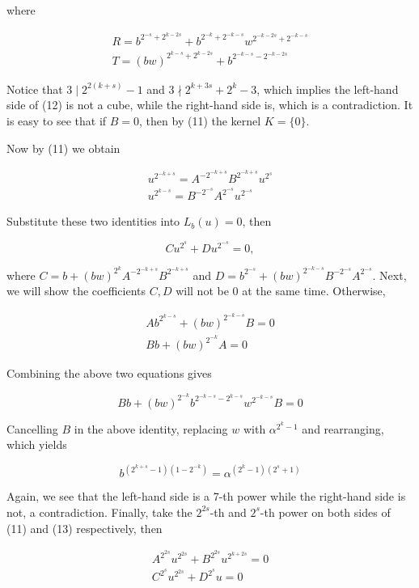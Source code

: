 \documentclass[10pt]{article}
\begin{document}
where

$$
\begin{gathered}
R=b^{2^{-s}+2^{k-2 s}}+b^{2^{-k}+2^{-k-s}} w^{2^{-k-2 s}+2^{-k-s}} \\
T=(b w)^{2^{k-s}+2^{k-2 s}}+b^{2^{-k-s}-2^{-k-2 s}}
\end{gathered}
$$

Notice that $3 \mid 2^{2(k+s)}-1$ and $3 \nmid 2^{k+3 s}+2^{k}-3$, which implies the left-hand side of (12) is not a cube, while the right-hand side is, which is a contradiction. It is easy to see that if $B=0$, then by (11) the kernel $K=\{0\}$.

Now by (11) we obtain

$$
\begin{gathered}
u^{2^{-k+s}}=A^{-2^{-k+s}} B^{2^{-k+s}} u^{2^{s}} \\
u^{2^{k-s}}=B^{-2^{-s}} A^{2^{-s}} u^{2^{-s}}
\end{gathered}
$$

Substitute these two identities into $L_{b}(u)=0$, then


\begin{equation*}
C u^{2^{s}}+D u^{2^{-s}}=0, \tag{13}
\end{equation*}


where $C=b+(b w)^{2^{k}} A^{-2^{-k+s}} B^{2^{-k+s}}$ and $D=b^{2^{-s}}+(b w)^{2^{-k-s}} B^{-2^{-s}} A^{2^{-s}}$. Next, we will show the coefficients $C, D$ will not be 0 at the same time. Otherwise,

$$
\begin{gathered}
A b^{2^{k-s}}+(b w)^{2^{-k-s}} B=0 \\
B b+(b w)^{2^{-k}} A=0
\end{gathered}
$$

Combining the above two equations gives

$$
B b+(b w)^{2^{-k}} b^{2^{-k-s}-2^{k-s}} w^{2^{-k-s}} B=0
$$

Cancelling $B$ in the above identity, replacing $w$ with $\alpha^{2^{k}-1}$ and rearranging, which yields

$$
b^{\left(2^{k+s}-1\right)\left(1-2^{-k}\right)}=\alpha^{\left(2^{k}-1\right)\left(2^{s}+1\right)}
$$

Again, we see that the left-hand side is a 7-th power while the right-hand side is not, a contradiction. Finally, take the $2^{2 s}$-th and $2^{s}$-th power on both sides of (11) and (13) respectively, then


\begin{gather*}
A^{2^{2 s}} u^{2^{2 s}}+B^{2^{2 s}} u^{2^{k+2 s}}=0  \tag{14}\\
C^{2^{s}} u^{2^{2 s}}+D^{2^{s}} u=0 \tag{15}
\end{gather*}
\end{document}
